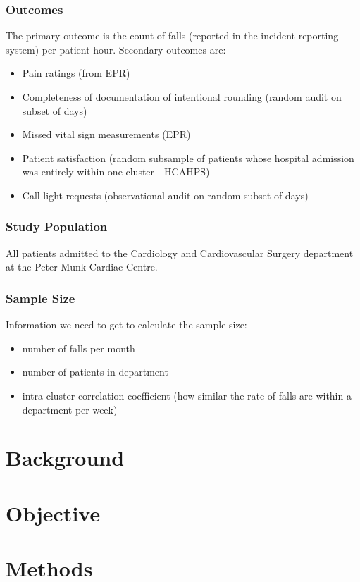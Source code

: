 \documentclass[12pt]{article}
\begin{document}
\subsubsection*{Outcomes}
The primary outcome is the count of falls (reported in the incident reporting system) per patient hour. Secondary outcomes are:
\begin{itemize}
    \item Pain ratings (from EPR)
    \item Completeness of documentation of intentional rounding (random audit on subset of days)
    \item Missed vital sign measurements (EPR)
    \item Patient satisfaction (random subsample of patients whose hospital admission was entirely within one cluster - HCAHPS)
    \item Call light requests (observational audit on random subset of days)
\end{itemize}

\subsubsection*{Study Population}
All patients admitted to the Cardiology and Cardiovascular Surgery department at the Peter Munk Cardiac Centre. 

\subsubsection*{Sample Size}
Information we need to get to calculate the sample size:
\begin{itemize}
    \item number of falls per month
    \item number of patients in department
    \item intra-cluster correlation coefficient (how similar the rate of falls are within a department per week)
\end{itemize}


\section{Background}




\section{Objective}


\section{Methods}
\end{document}

